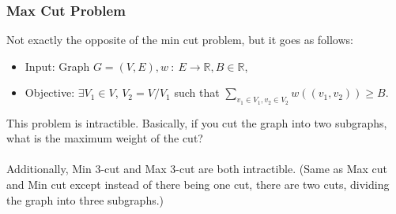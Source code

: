 \documentclass[10pt]{article}
\begin{document}
\subsubsection*{Max Cut Problem}
Not exactly the opposite of the min cut problem, but it goes as follows:
\begin{itemize}
    \item Input: Graph $G = (V, E), w \::\: E \rightarrow \mathbb{R}, B \in \mathbb{R}$, 
    \item Objective: $\exists V_1 \in V$, $V_2 = V / V_1$ such that $\sum_{v_1 \in V_1, v_2 \in V_2} w((v_1, v_2)) \geq B$.
\end{itemize}
This problem is intractible.  Basically, if you cut the graph into two subgraphs, what is the maximum weight of the cut?\\\\
Additionally, Min 3-cut and Max 3-cut are both intractible.  (Same as Max cut and Min cut except instead of there being one cut, there are two cuts, dividing the graph into three subgraphs.)
\end{document}
